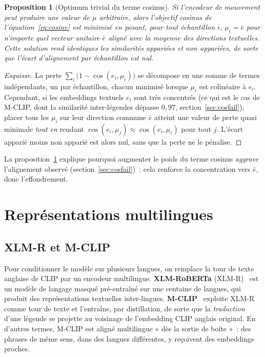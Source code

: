 \documentclass[12pt,a4paper,oneside]{report}
\theoremstyle{definition}
\theoremstyle{plain}
\newtheorem{proposition}{Proposition}[chapter]
\begin{document}
\begin{proposition}[Optimum trivial du terme cosinus]
\label{prop:cosine}
Si l'encodeur de mouvement peut produire une valeur de $\mu$ arbitraire, alors
l'objectif cosinus de l'équation~\eqref{eq:cosine} est minimisé en posant, pour
\emph{tout} échantillon $i$, $\mu_i = \bar{e}$ pour n'importe quel vecteur unitaire
$\bar{e}$ aligné avec la moyenne des directions textuelles. Cette solution rend
identiques les similarités appariées et non appariées, de sorte que l'écart
d'alignement par échantillon est nul.
\end{proposition}

\begin{proof}[Esquisse]
La perte $\sum_i\big(1-\cos(e_i,\mu_i)\big)$ se décompose en une somme de termes
indépendants, un par échantillon, chacun minimisé lorsque $\mu_i$ est colinéaire à
$e_i$. Cependant, si les embeddings textuels $e_i$ sont très concentrés (ce qui est
le cas de M-CLIP, dont la similarité inter-légendes dépasse $0{,}97$,
section~\ref{sec:cosfail}), placer tous les $\mu_i$ sur leur direction commune
$\bar{e}$ atteint une valeur de perte quasi minimale \emph{tout en} rendant
$\cos(e_i,\mu_j)\approx\cos(e_i,\mu_i)$ pour tout $j$. L'écart apparié moins non
apparié est alors nul, sans que la perte ne le pénalise.
\end{proof}

\noindent La proposition~\ref{prop:cosine} explique pourquoi augmenter le poids du
terme cosinus \emph{aggrave} l'alignement observé (section~\ref{sec:cosfail})~:
cela renforce la concentration vers $\bar{e}$, donc l'effondrement.

\section{Représentations multilingues}
\label{sec:multiling}

\subsection{XLM-R et M-CLIP}

Pour conditionner le modèle sur plusieurs langues, on remplace la tour de texte
anglaise de CLIP par un encodeur multilingue. \textbf{XLM-RoBERTa}
(XLM-R)~\cite{conneau2020xlmr} est un modèle de langage masqué pré-entraîné sur
une centaine de langues, qui produit des représentations textuelles
inter-lingues. \textbf{M-CLIP}~\cite{carlsson2022mclip} exploite XLM-R comme tour
de texte et l'entraîne, par distillation, de sorte que la \emph{traduction} d'une
légende se projette au voisinage de l'embedding CLIP anglais original. En d'autres
termes, M-CLIP est aligné multilingue « dès la sortie de boîte »~: des phrases de
même sens, dans des langues différentes, y reçoivent des embeddings proches.
\end{document}
